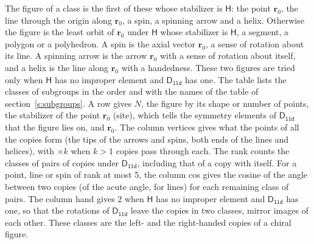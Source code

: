 \documentclass[10pt,a4paper]{article}
\numberwithin{equation}{section}
\newcommand{\grp}[1]{\mathsf{#1}}
\newcommand{\pointr}{\mathbf{r}}
\begin{document}
\leavevmode\label{n:head.figure}The figure of a class is the first of these whose stabilizer is $\grp{H}$: the point $\pointr_0$, the line through the origin along $\pointr_0$, a spin, a spinning arrow and a helix. Otherwise the figure is the least orbit of $\pointr_0$ under $\grp{H}$ whose stabilizer is $\grp{H}$, a segment, a polygon or a polyhedron. A spin is the axial vector $\pointr_0$, a sense of rotation about its line. A spinning arrow is the arrow $\pointr_0$ with a sense of rotation about itself, and a helix is the line along $\pointr_0$ with a handedness. These two figures are tried only when $\grp{H}$ has no improper element and $\grp{D_{11d}}$ has one. The table lists the classes of subgroups in the order and with the names of the table of section~\ref{s:subgroups}. \label{n:head.site}A row gives $N$, the figure by its shape or number of points, the stabilizer of the point $\pointr_0$ (site), which tells the symmetry elements of $\grp{D_{11d}}$ that the figure lies on, and $\pointr_0$. \label{n:head.vertices}The column vertices gives what the points of all the copies form (the tips of the arrows and spins, both ends of the lines and helices), with ${\times}k$ when $k > 1$ copies pass through each. \label{n:head.rank}The rank counts the classes of pairs of copies under $\grp{D_{11d}}$, including that of a copy with itself. \label{n:head.cos}For a point, line or spin of rank at most 5, the column cos gives the cosine of the angle between two copies (of the acute angle, for lines) for each remaining class of pairs. \label{n:head.hand}The column hand gives 2 when $\grp{H}$ has no improper element and $\grp{D_{11d}}$ has one, so that the rotations of $\grp{D_{11d}}$ leave the copies in two classes, mirror images of each other. These classes are the left- and the right-handed copies of a chiral figure.
\end{document}
